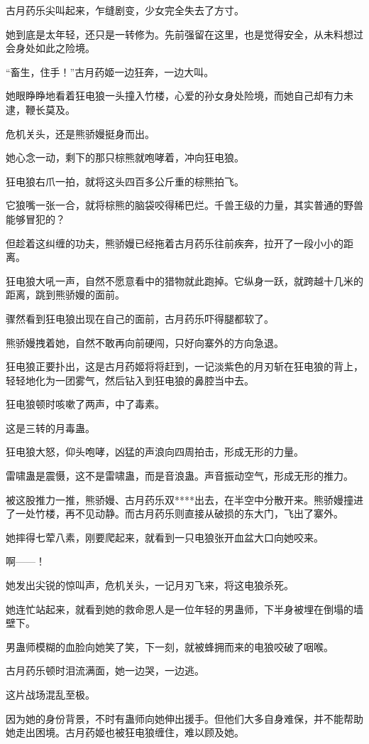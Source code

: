 \begin{this_body}
古月药乐尖叫起来，乍缝剧变，少女完全失去了方寸。

她到底是太年轻，还只是一转修为。先前强留在这里，也是觉得安全，从未料想过会身处如此之险境。

“畜生，住手！”古月药姬一边狂奔，一边大叫。

她眼睁睁地看着狂电狼一头撞入竹楼，心爱的孙女身处险境，而她自己却有力未逮，鞭长莫及。

危机关头，还是熊骄嫚挺身而出。

她心念一动，剩下的那只棕熊就咆哮着，冲向狂电狼。

狂电狼右爪一拍，就将这头四百多公斤重的棕熊拍飞。

它狼嘴一张一合，就将棕熊的脑袋咬得稀巴烂。千兽王级的力量，其实普通的野兽能够冒犯的？

但趁着这纠缠的功夫，熊骄嫚已经拖着古月药乐往前疾奔，拉开了一段小小的距离。

狂电狼大吼一声，自然不愿意看中的猎物就此跑掉。它纵身一跃，就跨越十几米的距离，跳到熊骄嫚的面前。

骤然看到狂电狼出现在自己的面前，古月药乐吓得腿都软了。

熊骄嫚拽着她，自然不敢再向前硬闯，只好向寨外的方向急退。

狂电狼正要扑出，这是古月药姬将将赶到，一记淡紫色的月刃斩在狂电狼的背上，轻轻地化为一团雾气，然后钻入到狂电狼的鼻腔当中去。

狂电狼顿时咳嗽了两声，中了毒素。

这是三转的月毒蛊。

狂电狼大怒，仰头咆哮，凶猛的声浪向四周拍击，形成无形的力量。

雷啸蛊是震慑，这不是雷啸蛊，而是音浪蛊。声音振动空气，形成无形的推力。

被这股推力一推，熊骄嫚、古月药乐双****出去，在半空中分散开来。熊骄嫚撞进了一处竹楼，再不见动静。而古月药乐则直接从破损的东大门，飞出了寨外。

她摔得七荤八素，刚要爬起来，就看到一只电狼张开血盆大口向她咬来。

啊——！

她发出尖锐的惊叫声，危机关头，一记月刃飞来，将这电狼杀死。

她连忙站起来，就看到她的救命恩人是一位年轻的男蛊师，下半身被埋在倒塌的墙壁下。

男蛊师模糊的血脸向她笑了笑，下一刻，就被蜂拥而来的电狼咬破了咽喉。

古月药乐顿时泪流满面，她一边哭，一边逃。

这片战场混乱至极。

因为她的身份背景，不时有蛊师向她伸出援手。但他们大多自身难保，并不能帮助她走出困境。古月药姬也被狂电狼缠住，难以顾及她。


\end{this_body}
